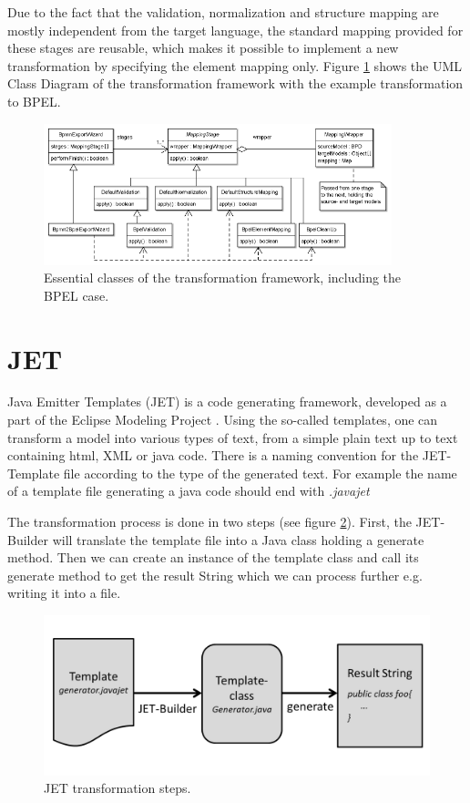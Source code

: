 Due to the fact that the validation, normalization and structure mapping are mostly independent from the target language, the standard mapping provided for these stages are reusable, which makes it possible to implement a new transformation by specifying the element mapping only. Figure \ref{fig:transform} shows the UML Class Diagram of the transformation framework with the example transformation to BPEL.
\begin{figure}[h]
	\centering
		\includegraphics[width=0.90\textwidth]{images/transformation.png}
	\caption{Essential classes of the transformation framework, including the BPEL case.\cite{TK07}}
	\label{fig:transform}
\end{figure}



\newpage
\section{JET}
Java Emitter Templates (JET) \cite{JETWEB} is a code generating framework, developed as a part of the Eclipse Modeling Project \cite{EMPWEB}. Using the so-called templates, one can transform a model into various types of text, from a simple plain text up to text containing html, XML or java code. There is a naming convention for the JET-Template file according to the type of the generated text. For example the name of a template file generating a java code should end with \textit{.javajet}

The transformation process is done in two steps (see figure \ref{fig:jet_process}). First, the JET-Builder will translate the template file into a Java class holding a generate method. Then we can create an instance of the template class and call its generate method to get the result String which we can process further e.g. writing it into a file. 
\begin{figure}[h]
  \label{fig:jet_process}
	\centering
		\includegraphics[width=1.0\textwidth]{images/jet_process.png}
	\caption{JET transformation steps.}
\end{figure}\\

